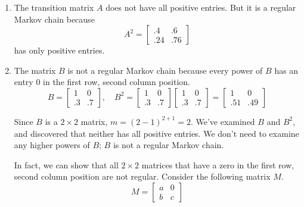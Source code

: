 \begin{solution}
    \begin{enumerate}
        \item The transition matrix \( A \) does not have all positive entries. But it is a regular Markov chain because
              \[ A^2 = \begin{bmatrix}
                      .4  & .6  \\
                      .24 & .76
                  \end{bmatrix} \]
              has only positive entries.

        \item The matrix \( B \) is not a regular Markov chain because every power of \( B \) has an entry \( 0 \) in the first row, second column position.
              \[ B = \begin{bmatrix}
                      1  & 0  \\
                      .3 & .7
                  \end{bmatrix}, \quad B^2 = \begin{bmatrix}
                      1  & 0  \\
                      .3 & .7
                  \end{bmatrix} \begin{bmatrix}
                      1  & 0  \\
                      .3 & .7
                  \end{bmatrix} = \begin{bmatrix}
                      1   & 0   \\
                      .51 & .49
                  \end{bmatrix} \]

              Since \( B \) is a \( 2 \times 2 \) matrix, \( m = (2-1)^{2+1} = 2 \). We’ve examined \( B \) and \( B^2 \), and discovered that neither has all positive entries. We don’t need to examine any higher powers of \( B \); \( B \) is not a regular Markov chain.

              In fact, we can show that all \( 2 \times 2 \) matrices that have a zero in the first row, second column position are not regular. Consider the following matrix \( M \).
              \[ M = \begin{bmatrix}
                      a & 0 \\
                      b & c
                  \end{bmatrix} \]


\end{enumerate}
\end{solution}
